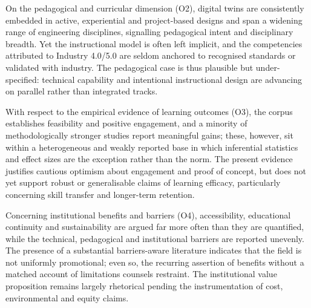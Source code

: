 On the pedagogical and curricular dimension (O2), digital twins are consistently
embedded in active, experiential and project-based designs and span a widening
range of engineering disciplines, signalling pedagogical intent and
disciplinary breadth. Yet the instructional model is often left implicit, and the
competencies attributed to Industry 4.0/5.0 are seldom anchored to recognised
standards or validated with industry. The pedagogical case is thus plausible but
under-specified: technical capability and intentional instructional design are
advancing on parallel rather than integrated tracks.

With respect to the empirical evidence of learning outcomes (O3), the corpus
establishes feasibility and positive engagement, and a minority of methodologically
stronger studies report meaningful gains; these, however, sit within a
heterogeneous and weakly reported base in which inferential statistics and effect
sizes are the exception rather than the norm. The present evidence justifies
cautious optimism about engagement and proof of concept, but does not yet support
robust or generalisable claims of learning efficacy, particularly concerning skill
transfer and longer-term retention.

Concerning institutional benefits and barriers (O4), accessibility, educational
continuity and sustainability are argued far more often than they are quantified,
while the technical, pedagogical and institutional barriers are reported
unevenly. The presence of a substantial barriers-aware literature indicates that
the field is not uniformly promotional; even so, the recurring assertion of
benefits without a matched account of limitations counsels restraint. The
institutional value proposition remains largely rhetorical pending the
instrumentation of cost, environmental and equity claims.

